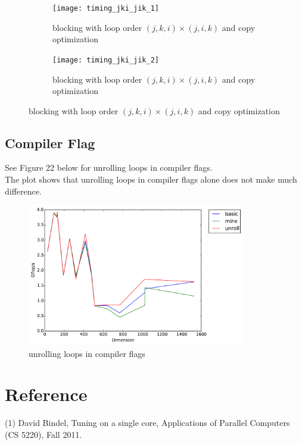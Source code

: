 \documentclass[12pt]{article}
\numberwithin{equation}{section}
\begin{document}
\begin{figure}[!ht]
   \begin{subfigure}
      \centering
        \begin{center}
      \texttt{[image: timing\_jki\_jik\_1]}
        \end{center}
      \label{aload0}
      \caption{blocking with loop order $(j, k, i)\times(j, i, k)$ and copy optimization}
  \end{subfigure}
  \begin{subfigure}
      \centering
        \begin{center}
      \texttt{[image: timing\_jki\_jik\_2]}
        \end{center}
      \label{aload1}
      \caption{blocking with loop order $(j, k, i)\times(j, i, k)$ and copy optimization}
  \end{subfigure}

\end{figure}





\subsection{Compiler Flag}

See Figure 22 below for unrolling loops in compiler flags.
\\
The plot shows that unrolling loops in compiler flags alone does not make much difference.

\begin{figure}[!ht]
\begin{center}
\includegraphics[width=0.85\textwidth] {timing_unroll}
\caption{unrolling loops in compiler flags}
\end{center}
\end{figure}





\section*{Reference}

(1) David Bindel, Tuning on a single core, Applications of Parallel Computers (CS 5220), Fall 2011.
\end{document}
